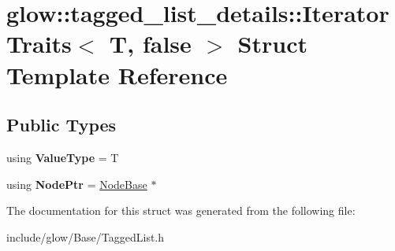 \hypertarget{structglow_1_1tagged__list__details_1_1_iterator_traits_3_01_t_00_01false_01_4}{}\section{glow\+:\+:tagged\+\_\+list\+\_\+details\+:\+:Iterator\+Traits$<$ T, false $>$ Struct Template Reference}
\label{structglow_1_1tagged__list__details_1_1_iterator_traits_3_01_t_00_01false_01_4}
\subsection*{Public Types}
\begin{DoxyCompactItemize}
\item 
\mbox{\label{structglow_1_1tagged__list__details_1_1_iterator_traits_3_01_t_00_01false_01_4_aff0eaa8e5c9a88f2796cef97cc093d60}} 
using {\bfseries Value\+Type} = T
\item 
\mbox{\label{structglow_1_1tagged__list__details_1_1_iterator_traits_3_01_t_00_01false_01_4_a7edb499141e41604a6b4f2bf6767b1ed}} 
using {\bfseries Node\+Ptr} = \hyperlink{classglow_1_1tagged__list__details_1_1_node_base}{Node\+Base} $\ast$
\end{DoxyCompactItemize}


The documentation for this struct was generated from the following file\+:\begin{DoxyCompactItemize}
\item 
include/glow/\+Base/Tagged\+List.\+h\end{DoxyCompactItemize}
